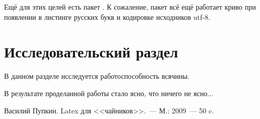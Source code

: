 \documentclass[utf8]{G7-32} %
\begin{document}
Ещё для этих целей есть пакет . К сожаление, пакет  всё ещё работает криво при появлении в листинге русских букв и кодировке исходников utf-8. 

\chapter{Исследовательский раздел}

В данном разделе исследуется работоспособность всячины.

\backmatter %

\Conclusion %

В результате проделанной работы стало ясно, что ничего не ясно...
%
\begin{thebibliography}{99}
 Василий Пупкин. Latex для <<чайников>>.~--- М.: 2009~--- 50 c.
\end{thebibliography}
\end{document}

